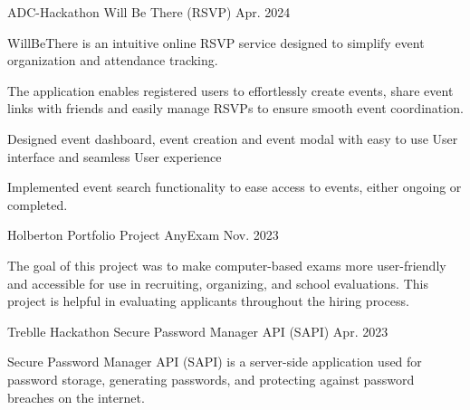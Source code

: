 \begin{cventries}
{\begin{cvitems}
    \end{cvitems}
  }
  \cventry
  {ADC-Hackathon} %
  {Will Be There (RSVP) } %
  {} %
  {Apr. 2024} %
  {
    \begin{cvitems} %
      \item {WillBeThere is an intuitive online RSVP service designed to
                  simplify event organization and attendance tracking.}
      \item {The application enables registered users to effortlessly create
                  events, share event links with friends and easily manage
                  RSVPs to ensure smooth
                  event coordination.}
      \item {Designed event dashboard, event creation and event modal with easy
                  to use User interface and seamless User experience}
      \item {Implemented event search functionality to ease access to events,
                  either ongoing or completed.}
    \end{cvitems}
  }
  \cventry
  {Holberton Portfolio Project} %
  {AnyExam } %
  {} %
  {Nov. 2023} %
  {
    \begin{cvitems} %
      \item {The goal of this project was to make computer-based exams more
                  user-friendly and accessible for use in recruiting,
                  organizing, and school
                  evaluations. This project is helpful in evaluating applicants
                  throughout the
                  hiring process.}
    \end{cvitems}
  }

  \cventry
  {Treblle Hackathon} %
  {Secure Password Manager API (SAPI) } %
  {} %
  {Apr. 2023} %
  {
    \begin{cvitems} %
      \item {Secure Password Manager API (SAPI) is a server-side application
                  used for password storage, generating passwords, and
                  protecting against
                  password breaches on the internet.}
    \end{cvitems}
  }


\end{cventries}
